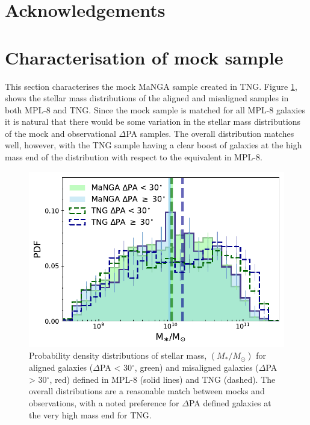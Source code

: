 \documentclass[fleqn,usenatbib]{mnras}
\begin{document}

\section*{Acknowledgements}

\appendix

\section{Characterisation of mock sample} \label{sec:mock_appendix}
This section characterises the mock MaNGA sample created in TNG. Figure \ref{fig:TNG_mpl8_stelM}, shows the stellar mass distributions of the aligned and misaligned samples in both MPL-8 and TNG. Since the mock sample is matched for all MPL-8 galaxies it is natural that there would be some variation in the stellar mass distributions of the mock and observational $\Delta$PA samples. The overall distribution matches well, however, with the TNG sample having a clear boost of galaxies at the high mass end of the distribution with respect to the equivalent in MPL-8.

\begin{figure}
	\includegraphics[width=\linewidth]{tng_appendix/delPA_split_stelM_tng_comparison.pdf}
    \caption{Probability density distributions of stellar mass, $(M_{\ast}/M_{\odot})$ for aligned galaxies ($\Delta$PA < 30$^{\circ}$, green) and misaligned galaxies ($\Delta$PA > 30$^{\circ}$, red) defined in MPL-8 (solid lines) and TNG (dashed). The overall distributions are a reasonable match between mocks and observations, with a noted preference for $\Delta$PA defined galaxies at the very high mass end for TNG.}
    \label{fig:TNG_mpl8_stelM}
\end{figure}
\end{document}
